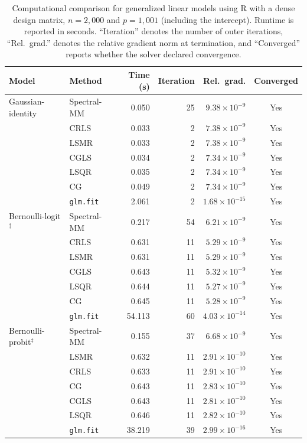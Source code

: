 
\begin{table}[htbp]
\centering
\small
\setlength{\tabcolsep}{4pt}
\caption{
Computational comparison for generalized linear models using R with a dense design matrix,
$n=2{,}000$ and $p=1{,}001$ (including the intercept).
Runtime is reported in seconds. ``Iteration\textquotedblright{} denotes the number of outer iterations,
``Rel.\ grad.\textquotedblright{} denotes the relative gradient norm at termination, and
``Converged\textquotedblright{} reports whether the solver declared convergence.}
\label{tab:r-glm-comparison-dense}
\begin{tabular}{llrrrc}
\toprule
Model & Method & Time (s) & Iteration & Rel.\ grad. & Converged \\
\midrule

Gaussian-identity
& Spectral-MM & 0.050 & 25 & $9.38\times10^{-9}$ & Yes \\
& CRLS & 0.033 & 2 & $7.38\times10^{-9}$ & Yes \\
& LSMR & 0.033 & 2 & $7.38\times10^{-9}$ & Yes \\
& CGLS & 0.034 & 2 & $7.34\times10^{-9}$ & Yes \\
& LSQR & 0.035 & 2 & $7.34\times10^{-9}$ & Yes \\
& CG & 0.049 & 2 & $7.34\times10^{-9}$ & Yes \\
& \texttt{glm.fit} & 2.061 & 2 & $1.68\times10^{-15}$ & Yes \\
\midrule

Bernoulli-logit$^{\ddagger}$
& Spectral-MM & 0.217 & 54 & $6.21\times10^{-9}$ & Yes \\
& CRLS & 0.631 & 11 & $5.29\times10^{-9}$ & Yes \\
& LSMR & 0.631 & 11 & $5.29\times10^{-9}$ & Yes \\
& CGLS & 0.643 & 11 & $5.32\times10^{-9}$ & Yes \\
& LSQR & 0.644 & 11 & $5.27\times10^{-9}$ & Yes \\
& CG & 0.645 & 11 & $5.28\times10^{-9}$ & Yes \\
& \texttt{glm.fit} & 54.113 & 60 & $4.03\times10^{-14}$ & Yes \\
\midrule

Bernoulli-probit$^{\ddagger}$
& Spectral-MM & 0.155 & 37 & $6.68\times10^{-9}$ & Yes \\
& LSMR & 0.632 & 11 & $2.91\times10^{-10}$ & Yes \\
& CRLS & 0.633 & 11 & $2.91\times10^{-10}$ & Yes \\
& CG & 0.643 & 11 & $2.83\times10^{-10}$ & Yes \\
& CGLS & 0.643 & 11 & $2.81\times10^{-10}$ & Yes \\
& LSQR & 0.646 & 11 & $2.82\times10^{-10}$ & Yes \\
& \texttt{glm.fit} & 38.219 & 39 & $2.99\times10^{-16}$ & Yes \\
\midrule


\end{tabular}
\end{table}
